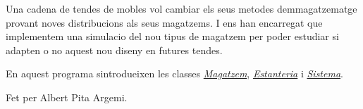 Una cadena de tendes de mobles vol cambiar els seus metodes d\textquotesingle{}emmagatzematge provant noves distribucions als seus magatzems. I ens han encarregat que implementem una simulacio del nou tipus de magatzem per poder estudiar si adapten o no aquest nou diseny en futures tendes.

En aquest programa s\textquotesingle{}introdueixen les classes {\itshape \hyperlink{class_magatzem}{Magatzem}}, {\itshape \hyperlink{class_estanteria}{Estanteria}} i {\itshape \hyperlink{class_sistema}{Sistema}}.

Fet per Albert Pita Argemi. 